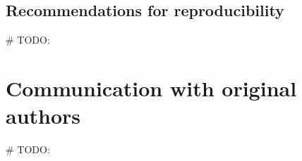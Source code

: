 \documentclass[11pt,a4paper]{article}
\begin{document}

\subsection{Recommendations for reproducibility}
\# TODO:

\section{Communication with original authors}
\# TODO:





\end{document}
